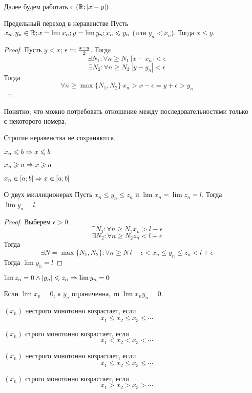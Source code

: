 Далее будем работать с $(\mathbb{R}; |x - y|)$.

\begin{theorem}{Предельный переход в неравенстве}
Пусть $x_n, y_n \in \mathbb{R}; x = \lim x_n; y = \lim y_n; x_n \leqslant y_n$ (или $y_n < x_n$). Тогда $x \leqslant y$.
\end{theorem}
\begin{proof}
Пусть $y < x$; $\epsilon \leftrightharpoons \frac{x - y}2$. Тогда 
$$\exists N_1: \forall n \geqslant N_1\: |x - x_n| < \epsilon$$
$$\exists N_2: \forall n \geqslant N_2\: |y - y_n| < \epsilon$$
Тогда
$$\forall n \geqslant \max\{N_1, N_2\}\: x_n > x - \epsilon = y + \epsilon > y_n$$
\end{proof}
\begin{Rem}
Понятно, что можно потребовать отношение между последовательностями только с некоторого номера.
\end{Rem}                                                 
\begin{Rem}
Строгие неравенства не сохраняются.
\end{Rem}
\begin{conseq}
$x_n \leqslant b \Rightarrow x \leqslant b$
\end{conseq}
\begin{conseq}
$x_n \geqslant a \Rightarrow x \geqslant a$
\end{conseq}
\begin{conseq}
$x_n \in [a;b] \Rightarrow x \in [a; b]$
\end{conseq}

\begin{theorem}{О двух миллиционерах}
Пусть $x_n \leqslant y_n \leqslant z_n$ и $\lim x_n = \lim z_n = l$. Тогда $\lim y_n = l$.
\end{theorem}
\begin{proof}
Выберем $\epsilon > 0$.
$$\exists N_1\colon\forall n \geqslant N_1 x_n > l - \epsilon$$
$$\exists N_2\colon\forall n \geqslant N_2 z_n < l + \epsilon$$
Тогда
$$\exists N = \max\{N_1,N_2\}\colon\forall n \geqslant N\:l - \epsilon < x_n \leqslant y_n \leqslant z_n < l + \epsilon$$
Тогда $\lim y_n = l$
\end{proof}
\begin{conseq}
$\lim z_n = 0 \land |y_n| \leqslant z_n \Rightarrow \lim y_n = 0$
\end{conseq}
\begin{conseq}
Если $\lim x_n = 0$, а $y_n$ ограниченна, то $\lim x_ny_n = 0$.
\end{conseq}

\begin{Def}
$(x_n)$ нестрого монотонно возрастает, если $$x_1 \leqslant x_2 \leqslant x_3 \leqslant \cdots$$

$(x_n)$ строго монотонно возрастает, если $$x_1 < x_2 < x_3 < \cdots$$

$(x_n)$ нестрого монотонно возрастает, если $$x_1 \leqslant x_2 \leqslant x_3 \leqslant \cdots$$

$(x_n)$ строго монотонно возрастает, если $$x_1 > x_2 > x_3 > \cdots$$
\end{Def}

